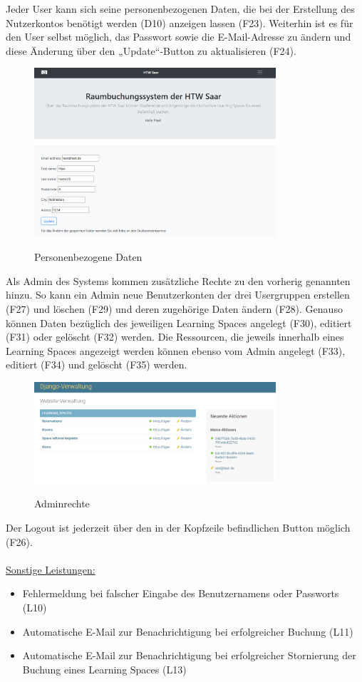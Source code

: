 \documentclass[a4paper,report,headsepline]{scrreprt}
\begin{document}
\clearpage
Jeder User kann sich seine personenbezogenen Daten, die bei der Erstellung des Nutzerkontos benötigt werden (D10) anzeigen lassen (F23). Weiterhin ist es für den User selbst möglich, das Passwort sowie die E-Mail-Adresse zu ändern und diese Änderung über den „Update“-Button zu aktualisieren (F24).
\begin{figure}[h]
    \centering
    \caption{Personenbezogene Daten}
    \includegraphics[width=0.8\textwidth]{Personenbezogene Daten}
    \label{fig:Personenbezogene Daten}
\end{figure}

Als Admin des Systems kommen zusätzliche Rechte zu den vorherig genannten hinzu. So kann ein Admin neue Benutzerkonten der drei Usergruppen erstellen (F27) und löschen (F29) und deren zugehörige Daten ändern (F28). Genauso können Daten bezüglich des jeweiligen Learning Spaces angelegt (F30), editiert (F31) oder gelöscht (F32) werden. Die Ressourcen, die jeweils innerhalb eines Learning Spaces angezeigt werden können ebenso vom Admin angelegt (F33), editiert (F34) und gelöscht (F35) werden.
\clearpage
\begin{figure}[h]
    \centering
    \caption{Adminrechte}
    \includegraphics[width=0.8\textwidth]{Adminrechte}
    \label{fig:Adminrechte}
\end{figure}
Der Logout ist jederzeit über den in der Kopfzeile befindlichen Button möglich (F26).\\ \\
\underline{{\large Sonstige Leistungen:}}
\begin{itemize}

\item Fehlermeldung bei falscher Eingabe des Benutzernamens oder Passworts (L10)\\
\item Automatische E-Mail zur Benachrichtigung bei erfolgreicher Buchung (L11)\\
\item Automatische E-Mail zur Benachrichtigung bei erfolgreicher Stornierung der Buchung eines Learning Spaces (L13)
\end{itemize}
\end{document}
